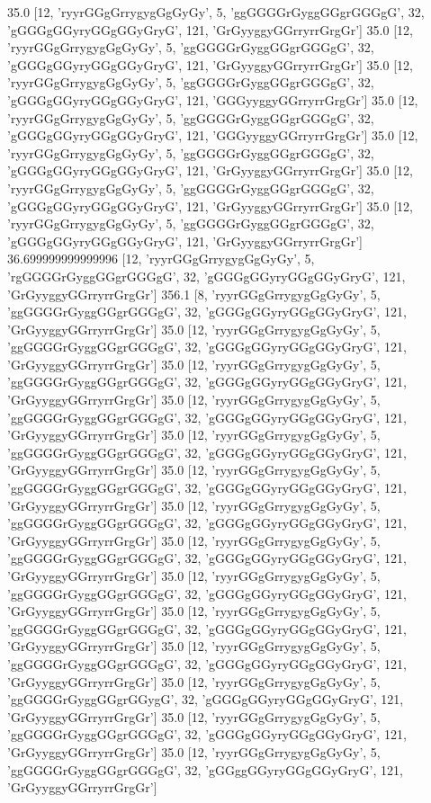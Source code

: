 35.0 [12, 'ryyrGGgGrrygygGgGyGy', 5, 'ggGGGGrGyggGGgrGGGgG', 32, 'gGGGgGGyryGGgGGyGryG', 121, 'GrGyyggyGGrryrrGrgGr']
35.0 [12, 'ryyrGGgGrrygygGgGyGy', 5, 'ggGGGGrGyggGGgrGGGgG', 32, 'gGGGgGGyryGGgGGyGryG', 121, 'GrGyyggyGGrryrrGrgGr']
35.0 [12, 'ryyrGGgGrrygygGgGyGy', 5, 'ggGGGGrGyggGGgrGGGgG', 32, 'gGGGgGGyryGGgGGyGryG', 121, 'GGGyyggyGGrryrrGrgGr']
35.0 [12, 'ryyrGGgGrrygygGgGyGy', 5, 'ggGGGGrGyggGGgrGGGgG', 32, 'gGGGgGGyryGGgGGyGryG', 121, 'GGGyyggyGGrryrrGrgGr']
35.0 [12, 'ryyrGGgGrrygygGgGyGy', 5, 'ggGGGGrGyggGGgrGGGgG', 32, 'gGGGgGGyryGGgGGyGryG', 121, 'GrGyyggyGGrryrrGrgGr']
35.0 [12, 'ryyrGGgGrrygygGgGyGy', 5, 'ggGGGGrGyggGGgrGGGgG', 32, 'gGGGgGGyryGGgGGyGryG', 121, 'GrGyyggyGGrryrrGrgGr']
35.0 [12, 'ryyrGGgGrrygygGgGyGy', 5, 'ggGGGGrGyggGGgrGGGgG', 32, 'gGGGgGGyryGGgGGyGryG', 121, 'GrGyyggyGGrryrrGrgGr']
36.699999999999996 [12, 'ryyrGGgGrrygygGgGyGy', 5, 'rgGGGGrGyggGGgrGGGgG', 32, 'gGGGgGGyryGGgGGyGryG', 121, 'GrGyyggyGGrryrrGrgGr']
356.1 [8, 'ryyrGGgGrrygygGgGyGy', 5, 'ggGGGGrGyggGGgrGGGgG', 32, 'gGGGgGGyryGGgGGyGryG', 121, 'GrGyyggyGGrryrrGrgGr']
35.0 [12, 'ryyrGGgGrrygygGgGyGy', 5, 'ggGGGGrGyggGGgrGGGgG', 32, 'gGGGgGGyryGGgGGyGryG', 121, 'GrGyyggyGGrryrrGrgGr']
35.0 [12, 'ryyrGGgGrrygygGgGyGy', 5, 'ggGGGGrGyggGGgrGGGgG', 32, 'gGGGgGGyryGGgGGyGryG', 121, 'GrGyyggyGGrryrrGrgGr']
35.0 [12, 'ryyrGGgGrrygygGgGyGy', 5, 'ggGGGGrGyggGGgrGGGgG', 32, 'gGGGgGGyryGGgGGyGryG', 121, 'GrGyyggyGGrryrrGrgGr']
35.0 [12, 'ryyrGGgGrrygygGgGyGy', 5, 'ggGGGGrGyggGGgrGGGgG', 32, 'gGGGgGGyryGGgGGyGryG', 121, 'GrGyyggyGGrryrrGrgGr']
35.0 [12, 'ryyrGGgGrrygygGgGyGy', 5, 'ggGGGGrGyggGGgrGGGgG', 32, 'gGGGgGGyryGGgGGyGryG', 121, 'GrGyyggyGGrryrrGrgGr']
35.0 [12, 'ryyrGGgGrrygygGgGyGy', 5, 'ggGGGGrGyggGGgrGGGgG', 32, 'gGGGgGGyryGGgGGyGryG', 121, 'GrGyyggyGGrryrrGrgGr']
35.0 [12, 'ryyrGGgGrrygygGgGyGy', 5, 'ggGGGGrGyggGGgrGGGgG', 32, 'gGGGgGGyryGGgGGyGryG', 121, 'GrGyyggyGGrryrrGrgGr']
35.0 [12, 'ryyrGGgGrrygygGgGyGy', 5, 'ggGGGGrGyggGGgrGGGgG', 32, 'gGGGgGGyryGGgGGyGryG', 121, 'GrGyyggyGGrryrrGrgGr']
35.0 [12, 'ryyrGGgGrrygygGgGyGy', 5, 'ggGGGGrGyggGGgrGGGgG', 32, 'gGGGgGGyryGGgGGyGryG', 121, 'GrGyyggyGGrryrrGrgGr']
35.0 [12, 'ryyrGGgGrrygygGgGyGy', 5, 'ggGGGGrGyggGGgrGGGgG', 32, 'gGGGgGGyryGGgGGyGryG', 121, 'GrGyyggyGGrryrrGrgGr']
35.0 [12, 'ryyrGGgGrrygygGgGyGy', 5, 'ggGGGGrGyggGGgrGGygG', 32, 'gGGGgGGyryGGgGGyGryG', 121, 'GrGyyggyGGrryrrGrgGr']
35.0 [12, 'ryyrGGgGrrygygGgGyGy', 5, 'ggGGGGrGyggGGgrGGGgG', 32, 'gGGGgGGyryGGgGGyGryG', 121, 'GrGyyggyGGrryrrGrgGr']
35.0 [12, 'ryyrGGgGrrygygGgGyGy', 5, 'ggGGGGrGyggGGgrGGGgG', 32, 'gGGggGGyryGGgGGyGryG', 121, 'GrGyyggyGGrryrrGrgGr']
